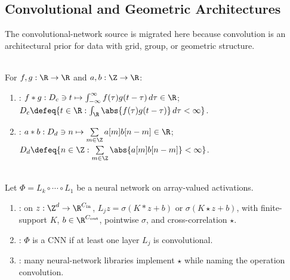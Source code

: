 \subsection{Convolutional and Geometric Architectures}

The convolutional-network source is migrated here because convolution is an architectural prior for data with grid, group, or geometric structure.

\begin{definition} \label{def:sl-convolution} \\
For $f,g:\R\to\R$ and $a,b:\Z\to\R$:
\begin{enumerate}[label=(\roman*)]
\setlength{\itemsep}{0pt}
\item {}: $f*g:D_c\ni t\mapsto\int_{-\infty}^{\infty}f(\tau)g(t-\tau)\,d\tau\in\R$; $D_c\defeq\{t\in\R:\int_\R\abs{f(\tau)g(t-\tau)}\,d\tau<\infty\}$.
\item {}: $a*b:D_d\ni n\mapsto\sum\limits_{m\in\Z}a[m]b[n-m]\in\R$; $D_d\defeq\{n\in\Z:\sum\limits_{m\in\Z}\abs{a[m]b[n-m]}<\infty\}$.
\end{enumerate}
\end{definition}

\begin{definition} \label{def:sl-convolutional-neural-network} \\
Let $\Phi=L_k\circ\cdots\circ L_1$ be a neural network on array-valued activations.
\begin{enumerate}[label=(\roman*)]
\setlength{\itemsep}{0pt}
\item {}: on $z:\Z^d\to\R^{C_{\rm in}}$, $L_jz=\sigma(K*z+b)$ or $\sigma(K\star z+b)$, with finite-support $K$, $b\in\R^{C_{\rm out}}$, pointwise $\sigma$, and cross-correlation $\star$.
\item {}: $\Phi$ is a CNN if at least one layer $L_j$ is convolutional.
\item {}: many neural-network libraries implement $\star$ while naming the operation convolution.
\end{enumerate}
\end{definition}

